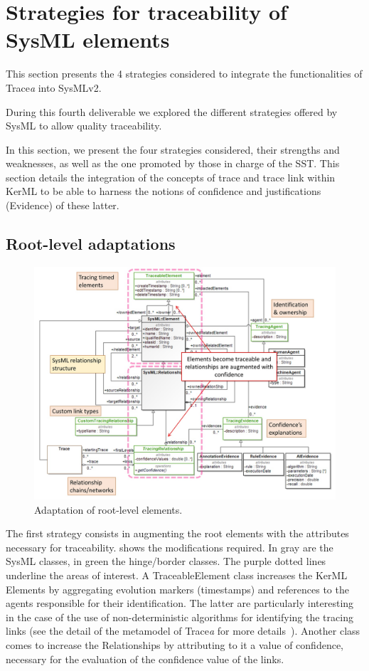 \section{Strategies for traceability of SysML elements}\label{sec:strategies}
This section presents the 4 strategies considered to integrate the functionalities of Trace\textit{a} into SysMLv2.
\sideboxend

During this fourth deliverable we explored the different strategies offered by SysML to allow quality traceability.

In this section, we present the four strategies considered, their strengths and weaknesses, as well as the one promoted by those in charge of the SST.
This section details the integration of the concepts of trace and trace link within KerML to be able to harness the notions of confidence and justifications (Evidence) of these latter. 
 
\subsection{Root-level adaptations}
\begin{figure}[h]     
	\centering
	\includegraphics[width=.95\linewidth]{images/strategy1-root.jpg}
	\caption{Adaptation of root-level elements. }
	\label{fig:strategy1}
\end{figure}
The first strategy consists in augmenting the root elements with the attributes necessary for traceability.  shows the modifications required. In gray are the SysML classes, in green the hinge/border classes. The purple dotted lines underline the areas of interest. A TraceableElement class increases the {KerML} Elements by aggregating evolution markers (timestamps) and references to the agents responsible for their identification. The latter are particularly interesting in the case of the use of non-deterministic algorithms for identifying the tracing links (see the detail of the metamodel of Trace\textit{a} for more details~\cite{deliverable2}).
Another class comes to increase the Relationships by attributing to it a value of confidence, necessary for the evaluation of the confidence value of the links.

